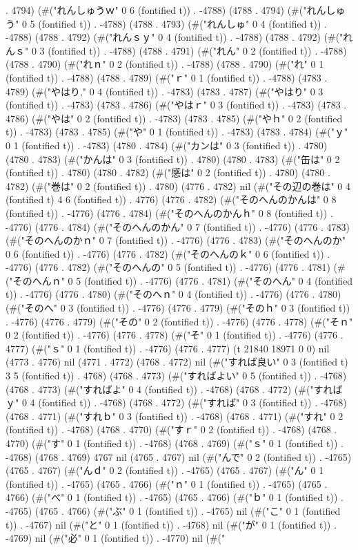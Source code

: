 . 4794) (#("れんしゅうｗ" 0 6 (fontified t)) . -4788) (4788 . 4794) (#("れんしゅう" 0 5 (fontified t)) . -4788) (4788 . 4793) (#("れんしゅ" 0 4 (fontified t)) . -4788) (4788 . 4792) (#("れんｓｙ" 0 4 (fontified t)) . -4788) (4788 . 4792) (#("れんｓ" 0 3 (fontified t)) . -4788) (4788 . 4791) (#("れん" 0 2 (fontified t)) . -4788) (4788 . 4790) (#("れｎ" 0 2 (fontified t)) . -4788) (4788 . 4790) (#("れ" 0 1 (fontified t)) . -4788) (4788 . 4789) (#("ｒ" 0 1 (fontified t)) . -4788) (4783 . 4789) (#("やはり," 0 4 (fontified t)) . -4783) (4783 . 4787) (#("やはり" 0 3 (fontified t)) . -4783) (4783 . 4786) (#("やはｒ" 0 3 (fontified t)) . -4783) (4783 . 4786) (#("やは" 0 2 (fontified t)) . -4783) (4783 . 4785) (#("やｈ" 0 2 (fontified t)) . -4783) (4783 . 4785) (#("や" 0 1 (fontified t)) . -4783) (4783 . 4784) (#("ｙ" 0 1 (fontified t)) . -4783) (4780 . 4784) (#("カンは" 0 3 (fontified t)) . 4780) (4780 . 4783) (#("かんは" 0 3 (fontified t)) . 4780) (4780 . 4783) (#("缶は" 0 2 (fontified t)) . 4780) (4780 . 4782) (#("感は" 0 2 (fontified t)) . 4780) (4780 . 4782) (#("巻は" 0 2 (fontified t)) . 4780) (4776 . 4782) nil (#("その辺の巻は" 0 4 (fontified t) 4 6 (fontified t)) . 4776) (4776 . 4782) (#("そのへんのかんは" 0 8 (fontified t)) . -4776) (4776 . 4784) (#("そのへんのかんｈ" 0 8 (fontified t)) . -4776) (4776 . 4784) (#("そのへんのかん" 0 7 (fontified t)) . -4776) (4776 . 4783) (#("そのへんのかｎ" 0 7 (fontified t)) . -4776) (4776 . 4783) (#("そのへんのか" 0 6 (fontified t)) . -4776) (4776 . 4782) (#("そのへんのｋ" 0 6 (fontified t)) . -4776) (4776 . 4782) (#("そのへんの" 0 5 (fontified t)) . -4776) (4776 . 4781) (#("そのへんｎ" 0 5 (fontified t)) . -4776) (4776 . 4781) (#("そのへん" 0 4 (fontified t)) . -4776) (4776 . 4780) (#("そのへｎ" 0 4 (fontified t)) . -4776) (4776 . 4780) (#("そのへ" 0 3 (fontified t)) . -4776) (4776 . 4779) (#("そのｈ" 0 3 (fontified t)) . -4776) (4776 . 4779) (#("その" 0 2 (fontified t)) . -4776) (4776 . 4778) (#("そｎ" 0 2 (fontified t)) . -4776) (4776 . 4778) (#("そ" 0 1 (fontified t)) . -4776) (4776 . 4777) (#("ｓ" 0 1 (fontified t)) . -4776) (4776 . 4777) (t 21840 18971 0 0) nil (4773 . 4776) nil (4771 . 4772) (4768 . 4772) nil (#("すれば良い" 0 3 (fontified t) 3 5 (fontified t)) . 4768) (4768 . 4773) (#("すればよい" 0 5 (fontified t)) . -4768) (4768 . 4773) (#("すればよ" 0 4 (fontified t)) . -4768) (4768 . 4772) (#("すればｙ" 0 4 (fontified t)) . -4768) (4768 . 4772) (#("すれば" 0 3 (fontified t)) . -4768) (4768 . 4771) (#("すれｂ" 0 3 (fontified t)) . -4768) (4768 . 4771) (#("すれ" 0 2 (fontified t)) . -4768) (4768 . 4770) (#("すｒ" 0 2 (fontified t)) . -4768) (4768 . 4770) (#("す" 0 1 (fontified t)) . -4768) (4768 . 4769) (#("ｓ" 0 1 (fontified t)) . -4768) (4768 . 4769) 4767 nil (4765 . 4767) nil (#("んで" 0 2 (fontified t)) . -4765) (4765 . 4767) (#("んｄ" 0 2 (fontified t)) . -4765) (4765 . 4767) (#("ん" 0 1 (fontified t)) . -4765) (4765 . 4766) (#("ｎ" 0 1 (fontified t)) . -4765) (4765 . 4766) (#("べ" 0 1 (fontified t)) . -4765) (4765 . 4766) (#("ｂ" 0 1 (fontified t)) . -4765) (4765 . 4766) (#("ぶ" 0 1 (fontified t)) . -4765) nil (#("こ" 0 1 (fontified t)) . -4767) nil (#("と" 0 1 (fontified t)) . -4768) nil (#("が" 0 1 (fontified t)) . -4769) nil (#("必" 0 1 (fontified t)) . -4770) nil (#("

